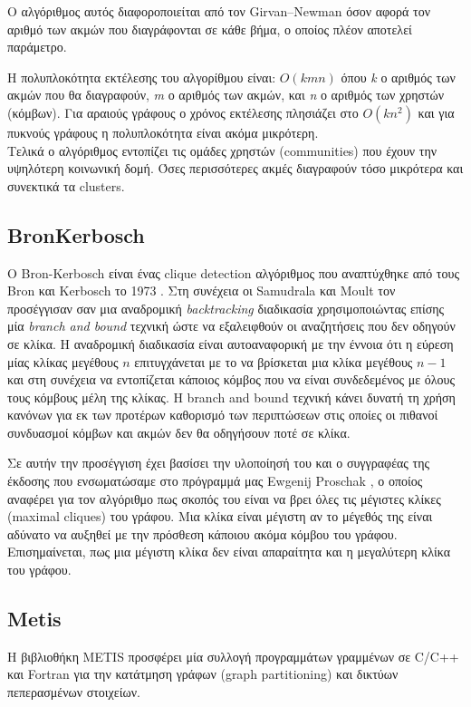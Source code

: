  Ο αλγόριθμος αυτός διαφοροποιείται από τον Girvan–Newman όσον αφορά τον αριθμό των ακμών που διαγράφονται σε κάθε βήμα, ο οποίος πλέον αποτελεί παράμετρο.  

Η πολυπλοκότητα εκτέλεσης του αλγορίθμου είναι: $O(kmn)$ όπου \emph{k} ο αριθμός των ακμών που θα διαγραφούν, \emph{m} ο αριθμός των ακμών, και \emph{n} ο αριθμός των χρηστών (κόμβων).
Για αραιούς γράφους ο χρόνος εκτέλεσης πλησιάζει στο $O(kn^2)$ και για πυκνούς γράφους η πολυπλοκότητα είναι ακόμα μικρότερη.\\
Τελικά ο αλγόριθμος εντοπίζει τις ομάδες χρηστών (communities) που έχουν την υψηλότερη κοινωνική δομή.
Όσες περισσότερες ακμές διαγραφούν τόσο μικρότερα και συνεκτικά τα clusters.


\subsection{BronKerbosch}
\label{BronKerbosch}
\noindent
Ο Bron-Kerbosch είναι ένας clique detection αλγόριθμος που αναπτύχθηκε από τους Bron και Kerbosch το 1973 \cite{Bron:1973:AFC:362342.362367}.
Στη συνέχεια οι Samudrala και Moult \cite{SamudralaMoult:2931890} τον προσέγγισαν σαν μια αναδρομική \emph{backtracking} διαδικασία
χρησιμοποιώντας επίσης μία \emph{branch and bound} τεχνική ώστε να εξαλειφθούν οι αναζητήσεις που δεν οδηγούν σε κλίκα.
Η αναδρομική διαδικασία είναι αυτοαναφορική με την έννοια ότι η εύρεση μίας κλίκας μεγέθους $n$
επιτυγχάνεται με το να βρίσκεται μια κλίκα μεγέθους $n-1$ και στη συνέχεια να εντοπίζεται κάποιος κόμβος που
να είναι συνδεδεμένος με όλους τους κόμβους μέλη της κλίκας. Η branch and bound τεχνική κάνει δυνατή τη χρήση κανόνων
για εκ των προτέρων καθορισμό των περιπτώσεων στις οποίες οι
πιθανοί συνδυασμοί κόμβων και ακμών δεν θα οδηγήσουν ποτέ σε κλίκα. 

Σε αυτήν την προσέγγιση έχει βασίσει την υλοποίησή του και ο συγγραφέας της έκδοσης που ενσωματώσαμε
στο πρόγραμμά μας Ewgenij Proschak \cite{BronKerbosch}, ο οποίος αναφέρει για τον αλγόριθμο
πως σκοπός του είναι να βρει όλες τις μέγιστες κλίκες (maximal cliques) του γράφου.
Μια κλίκα είναι μέγιστη αν το μέγεθός της είναι αδύνατο να αυξηθεί με την πρόσθεση κάποιου ακόμα κόμβου του γράφου.
Επισημαίνεται, πως μια μέγιστη κλίκα δεν είναι απαραίτητα και η μεγαλύτερη κλίκα του γράφου.

\subsection{Metis}
\label{Metis}
\noindent
H βιβλιοθήκη METIS \cite{Metis} προσφέρει μία συλλογή προγραμμάτων γραμμένων σε C/C++ και Fortran για την κατάτμηση 
γράφων (graph partitioning) και δικτύων πεπερασμένων στοιχείων.

